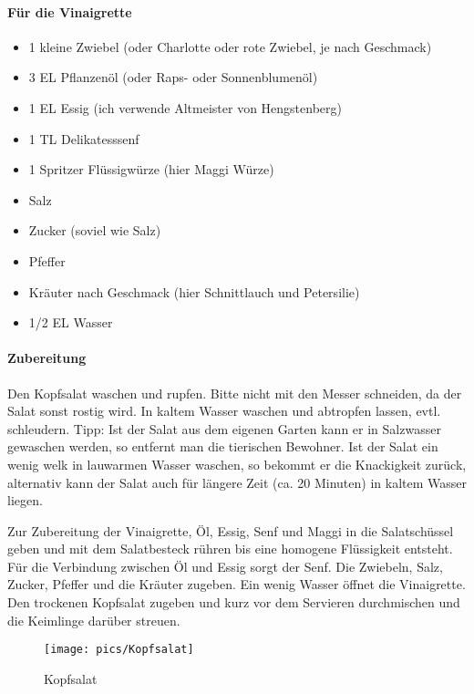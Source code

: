 \paragraph{Für die Vinaigrette}

\begin{itemize}[noitemsep]	
	\item 1 kleine Zwiebel  (oder Charlotte oder rote Zwiebel, je nach Geschmack)
	\item 3 EL Pflanzenöl (oder Raps- oder Sonnenblumenöl)
	\item 1 EL Essig (ich verwende Altmeister von Hengstenberg)
	\item 1 TL Delikatesssenf
	\item 1 Spritzer Flüssigwürze (hier Maggi Würze)
	\item Salz 
	\item Zucker (soviel wie Salz)
	\item Pfeffer
	\item Kräuter nach Geschmack (hier Schnittlauch und Petersilie)
	
	\item 1/2 EL Wasser
\end{itemize}

\paragraph{Zubereitung}

Den Kopfsalat waschen und rupfen. Bitte nicht mit den Messer schneiden, da der Salat sonst rostig wird. In kaltem Wasser waschen und 
abtropfen lassen, evtl. 
schleudern.
Tipp: Ist der Salat aus dem eigenen Garten kann er in Salzwasser gewaschen werden, so entfernt man die tierischen Bewohner. Ist der 
Salat ein wenig welk in 
lauwarmen 
Wasser waschen, so bekommt er die Knackigkeit zurück, alternativ kann der Salat auch für längere Zeit (ca. 20 Minuten) in kaltem 
Wasser liegen.

Zur Zubereitung der Vinaigrette, Öl, Essig, Senf und Maggi in die Salatschüssel geben und mit dem Salatbesteck rühren bis eine 
homogene Flüssigkeit entsteht. 
Für die 
Verbindung zwischen Öl und Essig sorgt der Senf. Die Zwiebeln, Salz, Zucker, Pfeffer und die Kräuter zugeben. Ein wenig Wasser öffnet 
die Vinaigrette. Den 
trockenen 
Kopfsalat zugeben und kurz vor dem Servieren durchmischen und die Keimlinge darüber streuen.
\newpage
\begin{figure}[h]
	\centering
	\texttt{[image: pics/Kopfsalat]}
	\caption{Kopfsalat}
	\label{fig:Kopfsalat}
\end{figure}

